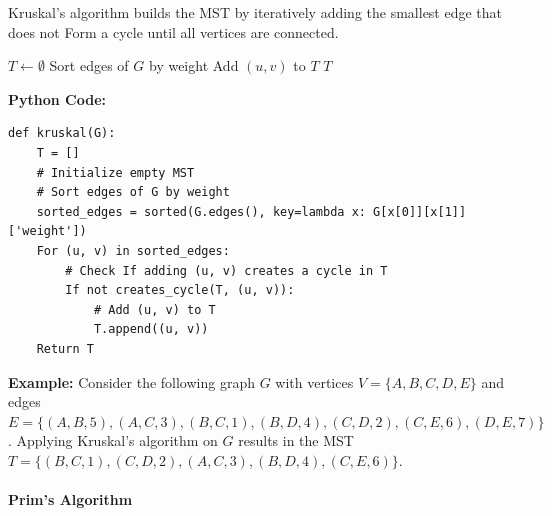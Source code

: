 \documentclass[12pt]{book} %
\begin{document}
Kruskal's algorithm builds the MST by iteratively adding the smallest edge that does not Form a cycle until all vertices are connected.
\FloatBarrier
\begin{algorithm}
\caption{Kruskal's Algorithm}
\begin{algorithmic}[1]
    \State $T \gets \emptyset$ 
    \State Sort edges of $G$ by weight
            \State Add $(u, v)$ to $T$
        \EndIf
    \EndFor
    \State \Return $T$
\EndFunction
\end{algorithmic}
\end{algorithm}
\textbf{Python Code:}
\FloatBarrier
\begin{verbatim}
def kruskal(G):
    T = []
    # Initialize empty MST
    # Sort edges of G by weight
    sorted_edges = sorted(G.edges(), key=lambda x: G[x[0]][x[1]]['weight'])
    For (u, v) in sorted_edges:
        # Check If adding (u, v) creates a cycle in T
        If not creates_cycle(T, (u, v)):
            # Add (u, v) to T
            T.append((u, v))
    Return T
\end{verbatim}
\FloatBarrier
\textbf{Example:} Consider the following graph $G$ with vertices $V = \{A, B, C, D, E\}$ and edges $E = \{(A, B, 5), (A, C, 3), (B, C, 1), (B, D, 4), (C, D, 2), (C, E, 6), (D, E, 7)\}$. Applying Kruskal's algorithm on $G$ results in the MST $T = \{(B, C, 1), (C, D, 2), (A, C, 3), (B, D, 4), (C, E, 6)\}$.

\paragraph{Prim's Algorithm}
\end{document}
